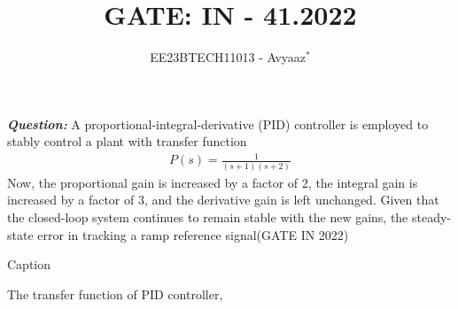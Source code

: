\documentclass[journal,12pt,twocolumn]{IEEEtran}
\theoremstyle{remark}
\begin{document}

\vspace{3cm}

\title{GATE: IN - 41.2022}
\author{EE23BTECH11013 - Avyaaz$^{*}$%
}
\maketitle
\newpage
\bigskip

\renewcommand{\thefigure}{\arabic{figure}}
\renewcommand{\thetable}{\arabic{table}}

\large\textbf{\textsl{Question:}}
A proportional-integral-derivative (PID) controller is employed to stably control a
plant with transfer function
\begin{align}
    P(s) = \frac{1}{(s+1)(s+2)}
\end{align}
Now, the proportional gain is increased by a factor of $2$, the integral gain is
increased by a factor of $3$, and the derivative gain is left unchanged. Given that the closed-loop system continues to remain stable with the new gains, the steady-state
error in tracking a ramp reference signal\hfill(GATE IN 2022) \\
\solution

\begin{table}[htbp]
    \centering
     
    \caption{Caption}
    \label{tab:my_label}
\end{table}
\noindent The transfer function of PID controller,
\end{document}
